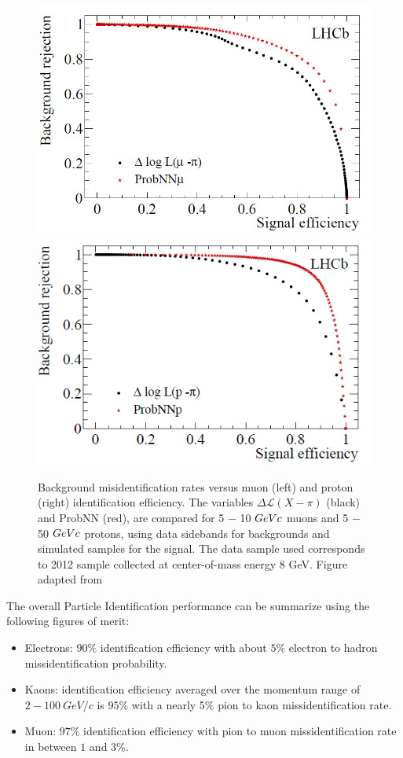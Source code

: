 \begin{figure}[h]
 \begin{center}
  \includegraphics[width=0.49\linewidth]{figures/PID_prob_left.PNG}
   \includegraphics[width=0.49\linewidth]{figures/PID_prob_right.PNG}
    \caption{Background misidentification rates versus muon (left) and proton (right)
identification efficiency. The variables $\Delta \mathcal{L} (X −\pi)$
(black) and ProbNN (red), are compared for 5 − 10 $GeV\/c$ muons and 5 − 50 $GeV\/c$ protons,
using data sidebands for backgrounds and simulated samples for the signal. The data sample
used corresponds to 2012 sample collected at center-of-mass energy 8 GeV. Figure adapted from \cite{PID}}%
\label{fig:PID baseline}%
 \end{center}
\end{figure}

The overall Particle Identification performance can be summarize using the following figures of merit:

\begin{itemize}
    \item Electrons: $90\%$ identification efficiency with about $5\%$ electron to hadron missidentification probability. 
    \item Kaons: identification efficiency averaged over the momentum range of\\ $2-100~ GeV/c$ is $95\%$ with a nearly $5\%$ pion to kaon missidentification rate. 
    \item Muon: $97\%$ identification efficiency with pion to muon missidentification rate in between $1$ and $3\%$.  
\end{itemize}


